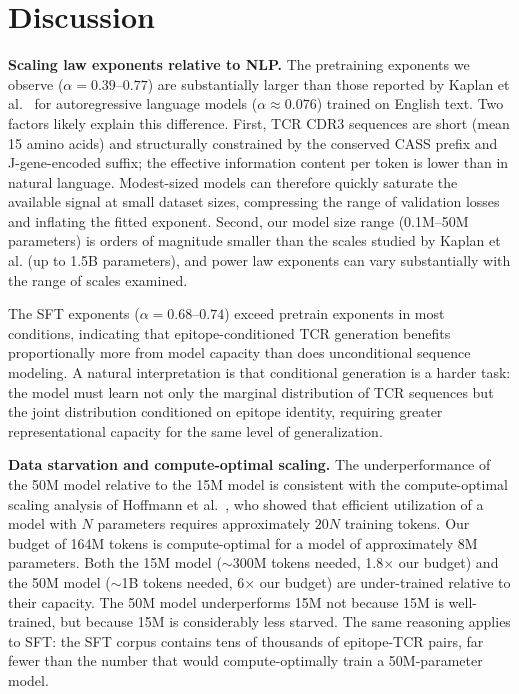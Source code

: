 \documentclass[12pt]{article}
\begin{document}
\section{Discussion}

\textbf{Scaling law exponents relative to NLP.}
The pretraining exponents we observe ($\alpha = 0.39$--$0.77$) are substantially larger
than those reported by Kaplan et al.~\cite{kaplan2020} for autoregressive language models
($\alpha \approx 0.076$) trained on English text. Two factors likely explain this difference.
First, TCR CDR3 sequences are short (mean 15 amino acids) and structurally constrained by
the conserved CASS prefix and J-gene-encoded suffix; the effective information content per
token is lower than in natural language. Modest-sized models can therefore quickly saturate
the available signal at small dataset sizes, compressing the range of validation losses and
inflating the fitted exponent. Second, our model size range (0.1M--50M parameters) is
orders of magnitude smaller than the scales studied by Kaplan et al. (up to 1.5B parameters),
and power law exponents can vary substantially with the range of scales examined.

The SFT exponents ($\alpha = 0.68$--$0.74$) exceed pretrain exponents in most conditions,
indicating that epitope-conditioned TCR generation benefits proportionally more from model
capacity than does unconditional sequence modeling. A natural interpretation is that
conditional generation is a harder task: the model must learn not only the marginal
distribution of TCR sequences but the joint distribution conditioned on epitope identity,
requiring greater representational capacity for the same level of generalization.

\textbf{Data starvation and compute-optimal scaling.}
The underperformance of the 50M model relative to the 15M model is consistent with the
compute-optimal scaling analysis of Hoffmann et al.~\cite{hoffmann2022}, who showed that
efficient utilization of a model with $N$ parameters requires approximately $20N$ training
tokens. Our budget of 164M tokens is compute-optimal for a model of approximately 8M
parameters. Both the 15M model ($\sim$300M tokens needed, 1.8$\times$ our budget) and the
50M model ($\sim$1B tokens needed, 6$\times$ our budget) are under-trained relative to their
capacity. The 50M model underperforms 15M not because 15M is well-trained, but because 15M is
considerably less starved.
The same reasoning applies to SFT: the SFT corpus contains tens of thousands of
epitope-TCR pairs, far fewer than the number that would compute-optimally train a 50M-parameter
model.
\end{document}

